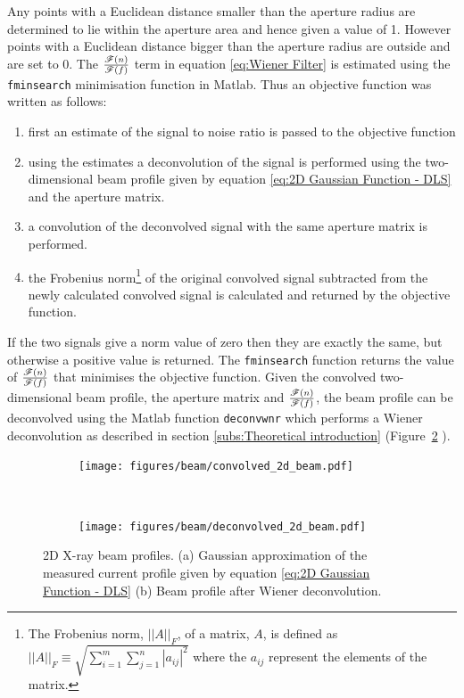 Any points with a Euclidean distance smaller than the aperture radius are determined to lie within the aperture area and hence given a value of 1.
However points with a Euclidean distance bigger than the aperture radius are outside and are set to 0.
\newline
The $\frac{\mathscr{F}(n)}{\mathscr{F}(f)}$ term in equation \ref{eq:Wiener Filter} is estimated using the \verb+fminsearch+ minimisation function in Matlab.
Thus an objective function was written as follows:
\begin{enumerate}
    \item first an estimate of the signal to noise ratio is passed to the objective function
    \item using the estimates a deconvolution of the signal is performed using the two-dimensional beam profile given by equation \ref{eq:2D Gaussian Function - DLS} and the aperture matrix.
    \item a convolution of the deconvolved signal with the same aperture matrix is performed.
    \item the Frobenius norm\footnote{The Frobenius norm, $||A||_F$, of a matrix, $A$, is defined as $||A||_F \equiv \sqrt{\sum_{i=1}^{m} \sum_{j=1}^{n} |a_{ij}|^2}$ where the $a_{ij}$ represent the elements of the matrix.} of the original convolved signal subtracted from the newly calculated convolved signal is calculated and returned by the objective function.
\end{enumerate}
If the two signals give a norm value of zero then they are exactly the same, but otherwise a positive value is returned.
The \verb+fminsearch+ function returns the value of $\frac{\mathscr{F}(n)}{\mathscr{F}(f)}$ that minimises the objective function.
Given the convolved two-dimensional beam profile, the aperture matrix and $\frac{\mathscr{F}(n)}{\mathscr{F}(f)}$, the beam profile can be deconvolved using the Matlab function \verb+deconvwnr+ which performs a Wiener deconvolution as described in section \ref{subs:Theoretical introduction} (Figure~\ref{fig:Deconvolved 2D beam profile - DLS} ).
\begin{figure}
        \centering
        \begin{subfigure}[b]{1.0\textwidth}
                \centering
                \texttt{[image: figures/beam/convolved\_2d\_beam.pdf]}
                \caption{}
                \label{fig:Gaussian approximation of convolved Beam profile - DLS}
        \end{subfigure}
				\\
        \begin{subfigure}[b]{1.0\textwidth}
                \centering
                \texttt{[image: figures/beam/deconvolved\_2d\_beam.pdf]}
                \caption{}
                \label{fig:Deconvolved 2D beam profile - DLS}
        \end{subfigure}
        \caption[2D X-ray beam profile reconstructions.]{2D X-ray beam profiles.
        (a) Gaussian approximation of the measured current profile given by equation \ref{eq:2D Gaussian Function - DLS}
        (b) Beam profile after Wiener deconvolution.}
        \label{fig:2D relative X-ray beam profiles, convolved and deconvolved}
\end{figure}


